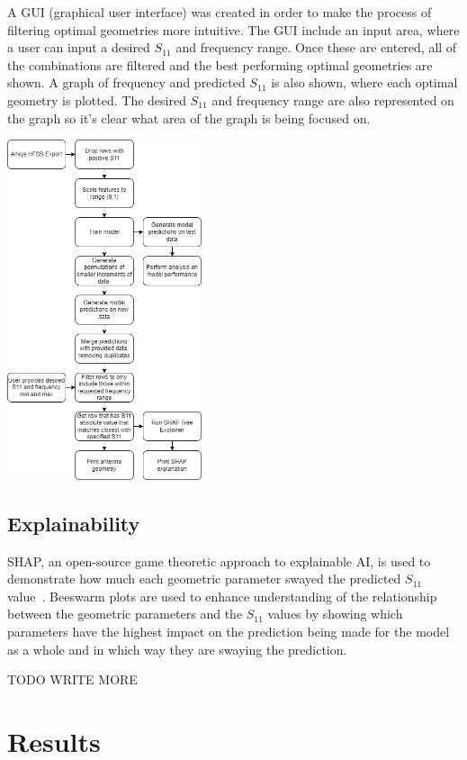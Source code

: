 \documentclass[conference]{IEEEtran}
\newenvironment{Figure}
    {\par\medskip\noindent\minipage{\linewidth}}
    {\endminipage\par\medskip}
\begin{document}
A GUI (graphical user interface) was created in order to make the process of filtering optimal geometries more intuitive. The GUI include an input area, where a user can input a desired $S_{11}$ and frequency range. Once these are entered, all of the combinations are filtered and the best performing optimal geometries are shown. A graph of frequency and predicted $S_{11}$ is also shown, where each optimal geometry is plotted. The desired $S_{11}$ and frequency range are also represented on the graph so it's clear what area of the graph is being focused on.

\begin{Figure}
\centering
\includegraphics[width=2.25in]{methodology}
\label{data_flow}
\end{Figure}


\subsection{Explainability}
SHAP, an open-source game theoretic approach to explainable AI, is used to demonstrate how much each geometric parameter swayed the predicted $S_{11}$ value~\cite{NIPS2017_7062}. Beeswarm plots are used to enhance understanding of the relationship between the geometric parameters and the $S_{11}$ values by showing which parameters have the highest impact on the prediction being made for the model as a whole and in which way they are swaying the prediction. 

TODO WRITE MORE


\section{Results}
\end{document}
